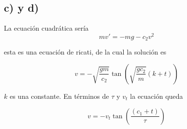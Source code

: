 \documentclass[10pt,twocolumn]{article}
\begin{document}
\subsection{c) y d)}
La ecuaci\'on cuadr\'atica ser\'ia
\begin{equation}
	mv'=-mg-c_2v^2
\label{cuad}
\end{equation}

esta es una ecuaci\'on de ricati, de la cual la soluci\'on es 

\begin{equation}
	v=-\sqrt{\frac{gm}{c_2}}\tan\left(\sqrt{\frac{gc_2}{m}}(k+t)\right)
\label{solcua}
\end{equation} 

$k$ es una constante. En t\'erminos de $\tau$ y $v_t$ la ecuaci\'on queda

\begin{equation}
	v=-v_t\tan\left(\frac{(c_1+t)}{\tau}\right)
\label{solcua}
\end{equation} 
\end{document}

